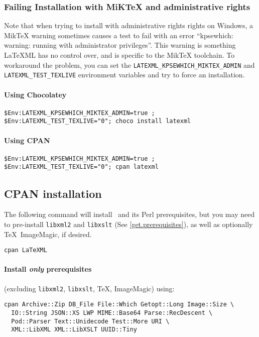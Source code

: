 \documentclass{article}
\begin{document}
\subsubsection*{Failing Installation with MiKTeX and administrative rights}\label{get.windows.miktexbug}

Note that when trying to install with administrative rights rights on Windows, a 
MikTeX warning sometimes causes a test to fail with an error
``kpsewhich: warning: running with administrator privileges''.
This warning is something LaTeXML has no control over, and is specific to the MikTeX toolchain.
To workaround the problem, you can set the \lstinline{LATEXML_KPSEWHICH_MIKTEX_ADMIN}
and \lstinline{LATEXML_TEST_TEXLIVE} environment variables and try to force an installation.

\paragraph*{Using Chocolatey}
\begin{lstlisting}[style=shell]
$Env:LATEXML_KPSEWHICH_MIKTEX_ADMIN=true ; $Env:LATEXML_TEST_TEXLIVE="0"; choco install latexml
\end{lstlisting}

\paragraph*{Using CPAN}
\begin{lstlisting}[style=shell]
$Env:LATEXML_KPSEWHICH_MIKTEX_ADMIN=true ; $Env:LATEXML_TEST_TEXLIVE="0"; cpan latexml
\end{lstlisting}

\subsection{CPAN installation}\label{get.cpan}
The following command will install \LaTeXML\ and its Perl prerequisites,
but you may need to pre-install \texttt{libxml2} and  \texttt{libxslt} (See \ref{get.prerequisites}),
as well as optionally \TeX\, ImageMagic, if desired.
\begin{lstlisting}[style=shell]
cpan LaTeXML
\end{lstlisting}

\paragraph*{Install \emph{only}  prerequisites}\label{get.cpan.prereq}
(excluding  \texttt{libxml2},  \texttt{libxslt}, \TeX, ImageMagic)
using:
\begin{lstlisting}[style=shell]
cpan Archive::Zip DB_File File::Which Getopt::Long Image::Size \
  IO::String JSON::XS LWP MIME::Base64 Parse::RecDescent \
  Pod::Parser Text::Unidecode Test::More URI \
  XML::LibXML XML::LibXSLT UUID::Tiny
\end{lstlisting}
\end{document}
